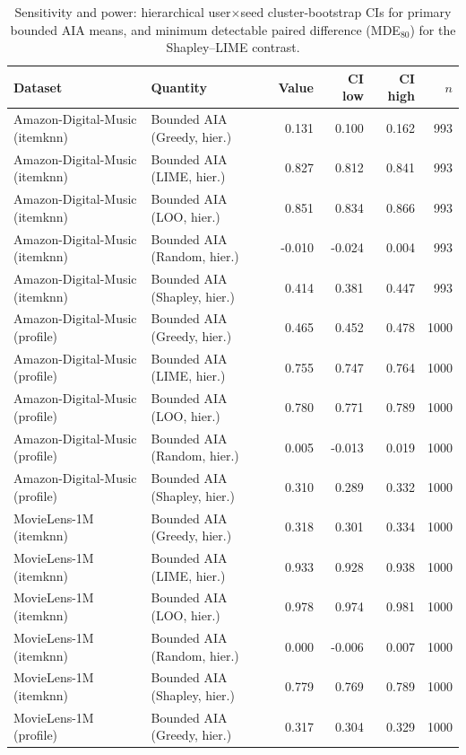 \begin{table}[t]\centering\scriptsize\setlength{\tabcolsep}{3pt}
\caption{Sensitivity and power: hierarchical user$\times$seed cluster-bootstrap
CIs for primary bounded AIA means, and minimum detectable paired difference
(MDE$_{80}$) for the Shapley--LIME contrast.}
\label{tab:sens-power}
\begin{tabular}{@{}llrrrr@{}}
\toprule
Dataset & Quantity & Value & CI low & CI high & $n$ \\
\midrule
Amazon-Digital-Music (itemknn) & Bounded AIA (Greedy, hier.) & 0.131 & 0.100 & 0.162 & 993 \\
Amazon-Digital-Music (itemknn) & Bounded AIA (LIME, hier.) & 0.827 & 0.812 & 0.841 & 993 \\
Amazon-Digital-Music (itemknn) & Bounded AIA (LOO, hier.) & 0.851 & 0.834 & 0.866 & 993 \\
Amazon-Digital-Music (itemknn) & Bounded AIA (Random, hier.) & -0.010 & -0.024 & 0.004 & 993 \\
Amazon-Digital-Music (itemknn) & Bounded AIA (Shapley, hier.) & 0.414 & 0.381 & 0.447 & 993 \\
Amazon-Digital-Music (profile) & Bounded AIA (Greedy, hier.) & 0.465 & 0.452 & 0.478 & 1000 \\
Amazon-Digital-Music (profile) & Bounded AIA (LIME, hier.) & 0.755 & 0.747 & 0.764 & 1000 \\
Amazon-Digital-Music (profile) & Bounded AIA (LOO, hier.) & 0.780 & 0.771 & 0.789 & 1000 \\
Amazon-Digital-Music (profile) & Bounded AIA (Random, hier.) & 0.005 & -0.013 & 0.019 & 1000 \\
Amazon-Digital-Music (profile) & Bounded AIA (Shapley, hier.) & 0.310 & 0.289 & 0.332 & 1000 \\
MovieLens-1M (itemknn) & Bounded AIA (Greedy, hier.) & 0.318 & 0.301 & 0.334 & 1000 \\
MovieLens-1M (itemknn) & Bounded AIA (LIME, hier.) & 0.933 & 0.928 & 0.938 & 1000 \\
MovieLens-1M (itemknn) & Bounded AIA (LOO, hier.) & 0.978 & 0.974 & 0.981 & 1000 \\
MovieLens-1M (itemknn) & Bounded AIA (Random, hier.) & 0.000 & -0.006 & 0.007 & 1000 \\
MovieLens-1M (itemknn) & Bounded AIA (Shapley, hier.) & 0.779 & 0.769 & 0.789 & 1000 \\
MovieLens-1M (profile) & Bounded AIA (Greedy, hier.) & 0.317 & 0.304 & 0.329 & 1000 \\

\end{tabular}
\end{table}
